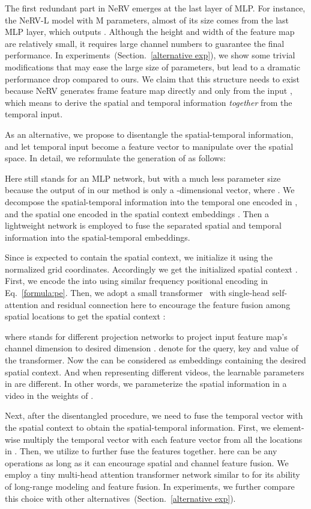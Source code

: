 \documentclass[runningheads]{llncs}
\begin{document}
The first redundant part in NeRV emerges at the last layer of MLP. For instance, the NeRV-L model with M parameters, almost  of its size comes from the last MLP layer, which outputs . Although the height and width of the feature map are relatively small, it requires large channel numbers to guarantee the final performance. In experiments~(Section.~\ref{alternative exp}), we show some trivial modifications that may ease the large size of parameters, but lead to a dramatic performance drop compared to ours. We claim that this structure needs to exist because NeRV generates frame feature map  directly and only from the input , which means to derive the spatial and temporal information \textit{together} from the temporal input. 

As an alternative, we propose to disentangle the spatial-temporal information, and let temporal input become a feature vector to manipulate over the spatial space. In detail, we reformulate the generation of  as follows:



Here  still stands for an MLP network, but with a much less parameter size because the output of  in our method is only a -dimensional vector, where . We decompose the spatial-temporal information into the temporal one encoded in , and the spatial one encoded in the spatial context embeddings . Then a lightweight network  is employed to fuse the separated spatial and temporal information into the spatial-temporal embeddings.

Since  is expected to contain the spatial context, we initialize it using the normalized grid coordinates. Accordingly we get the initialized spatial context . First, we encode the  into  using similar frequency positional encoding  in Eq.~\ref{formula:pe}. Then, we adopt a small transformer~\cite{vaswani2017attention} with single-head self-attention and residual connection here to encourage the feature fusion among spatial locations to get the spatial context :


where  stands for different projection networks to project input feature map's channel dimension to desired dimension .  denote for the query, key and value of the transformer. Now the  can be considered as embeddings containing the desired spatial context. And when representing different videos, the learnable parameters in  are different. In other words, we parameterize the spatial information in a video in the weights of .


Next, after the disentangled procedure, we need to fuse the temporal vector  with the spatial context   to obtain the spatial-temporal information. First, we element-wise multiply the temporal vector with each feature vector from all the locations in . Then, we utilize  to further fuse the features together.  here can be any operations as long as it can encourage spatial and channel feature fusion. We employ a tiny multi-head attention transformer network similar to  for its ability of long-range modeling and feature fusion. In experiments, we further compare this choice with other alternatives~(Section.~\ref{alternative exp}). 
\end{document}
